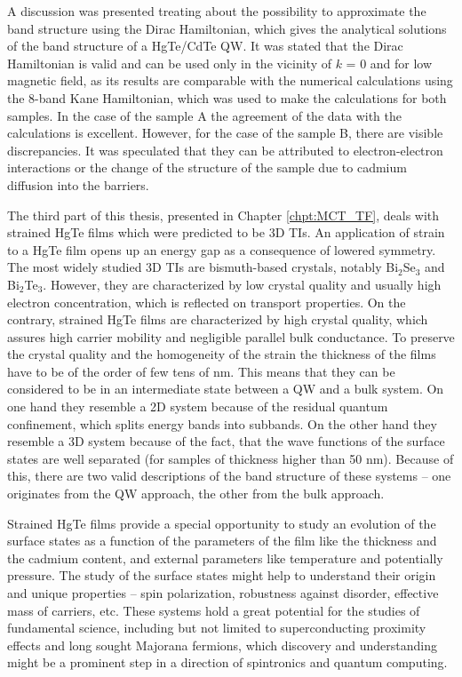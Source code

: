 \documentclass[titlepage,a4paper]{book}
\begin{document}
A discussion was presented treating about the possibility to approximate the band structure using the Dirac Hamiltonian, which gives the analytical solutions of the band structure of a HgTe/CdTe QW. It was stated that the Dirac Hamiltonian is valid and can be used only in the vicinity of $k$ = 0 and for low magnetic field, as its results are comparable with the numerical calculations using the 8-band Kane Hamiltonian, which was used to make the calculations for both samples. In the case of the sample A the agreement of the data with the calculations is excellent. However, for the case of the sample B, there are visible discrepancies. It was speculated that they can be attributed to electron-electron interactions or the change of the structure of the sample due to cadmium diffusion into the barriers.
\vspace{5mm}

The third part of this thesis, presented in Chapter \ref{chpt:MCT_TF}, deals with strained HgTe films which were predicted to be 3D TIs. An application of strain to a HgTe film opens up an energy gap as a consequence of lowered symmetry. The most widely studied 3D TIs are bismuth-based crystals, notably Bi$_2$Se$_3$ and Bi$_2$Te$_3$. However, they are characterized by low crystal quality and usually high electron concentration, which is reflected on transport properties. On the contrary, strained HgTe films are characterized by high crystal quality, which assures high carrier mobility and negligible parallel bulk conductance. To preserve the crystal quality and the homogeneity of the strain the thickness of the films have to be of the order of few tens of nm. This means that they can be considered to be in an intermediate state between a QW and a bulk system. On one hand they resemble a 2D system because of the residual quantum confinement, which splits energy bands into subbands. On the other hand they resemble a 3D system because of the fact, that the wave functions of the surface states are well separated (for samples of thickness higher than 50 nm). Because of this, there are two valid descriptions of the band structure of these systems -- one originates from the QW approach, the other from the bulk approach. 

Strained HgTe films provide a special opportunity to study an evolution of the surface states as a function of the parameters of the film like the thickness and the cadmium content, and external parameters like temperature and potentially pressure. The study of the surface states might help to understand their origin and unique properties -- spin polarization, robustness against disorder, effective mass of carriers, etc. These systems hold a great potential for the studies of fundamental science, including but not limited to superconducting proximity effects and long sought Majorana fermions, which discovery and understanding might be a prominent step in a direction of spintronics and quantum computing.
\end{document}
